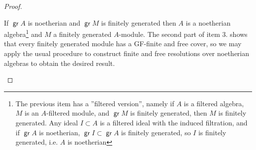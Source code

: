 \documentclass[11pt,fleqn]{article}
\theoremstyle{plain}
\theoremstyle{remark}
\theoremstyle{definition}
\DeclareMathOperator\gr{\mathsf{gr}}
\begin{document}
\begin{proof}
\begin{enumerate}
	If $\gr A$ is noetherian and $\gr M$ is finitely generated then $A$ is a
	noetherian algebra\footnote{The previous item has a ''filtered version'', namely
	if $A$ is a filtered algebra, $M$ is an $A$-filtered module, and $\gr M$ is finitely
	generated, then $M$ is finitely generated. Any ideal $I\subset A$ is a filtered
	ideal with the induced filtration, and if $\gr A$ is noetherian, $\gr I \subset
	\gr A$ is finitely generated, so $I$ is finitely generated, i.e. $A$ is
	noetherian} and $M$ a  	finitely generated $A$-module. The second part of item 	3.
	shows that every finitely generated module has a GF-finite and free cover, so we
	may apply the usual procedure to construct finite and free resolutions over
	noetherian algebras to obtain the desired result.
	\end{enumerate}
\end{proof}
\end{document}
